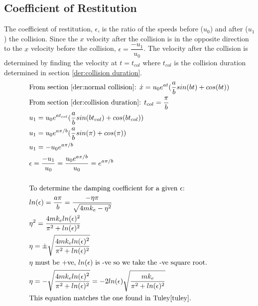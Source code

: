 \documentclass[a4paper,11pt,titlepage]{report}
\begin{document}
\subsection{Coefficient of Restitution}
\label{der:coefficient of restitution}
The coefficient of restitution, $\epsilon$, is the ratio of the speeds before ($u_0$) and after ($u_1$) the collision. Since the $x$ velocity after the collision is in the opposite direction to the $x$ velocity before the collision, $\epsilon = \dfrac{- u_1}{u_0}$. The velocity after the collision is determined by finding the velocity at $t = t_{col}$ where $t_{col}$ is the collision duration determined in section \ref{der:collision duration}.
\begin{align*}
&\text{From section \ref{der:normal collision}: } \dot{x} = u_0 e^{at} (\dfrac{a}{b} sin(bt) + cos(bt)) \\
&\text{From section \ref{der:collision duration}: } t_{col} = \dfrac{\pi}{b} \\
&u_1 = u_0 e^{at_{col}} (\dfrac{a}{b} sin(bt_{col}) + cos(bt_{col})) \\
&u_1 = u_0 e^{a \pi / b} (\dfrac{a}{b} sin(\pi) + cos(\pi)) \\
&u_1 = - u_0 e^{a \pi / b} \\
&\epsilon = \dfrac{- u_1}{u_0} = \dfrac{u_0 e^{a \pi / b}}{u_0} = e^{a \pi / b} \\\\
&\text{To determine the damping coefficient for a given $\epsilon$:} \\
&ln(\epsilon) = \dfrac{a \pi}{b} = \dfrac{- \eta \pi}{\sqrt{4 m k_e - \eta^2}} \\
&\eta^2 = \dfrac{4 m k_e ln(\epsilon)^2}{\pi^2 + ln(\epsilon)^2} \\
&\eta = \pm \sqrt{\dfrac{4 m k_e ln(\epsilon)^2}{\pi^2 + ln(\epsilon)^2}} \\
&\text{$\eta$ must be +ve, $ln(\epsilon)$ is -ve so we take the -ve square root.} \\
&\eta = - \sqrt{\dfrac{4 m k_e ln(\epsilon)^2}{\pi^2 + ln(\epsilon)^2}} 
 = - 2 ln(\epsilon) \sqrt{\dfrac{m k_e}{\pi^2 + ln(\epsilon)^2}} \\
&\text{This equation matches the one found in Tuley\cite{tuley}.}
\end{align*}
\end{document}
